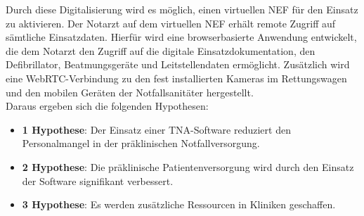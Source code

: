 Durch diese Digitalisierung wird es möglich, einen virtuellen \ac{NEF} für den Einsatz zu aktivieren. Der Notarzt auf dem virtuellen \ac{NEF} erhält remote Zugriff auf sämtliche Einsatzdaten. Hierfür wird eine browserbasierte Anwendung entwickelt, die dem Notarzt den Zugriff auf die digitale Einsatzdokumentation, den Defibrillator, Beatmungsgeräte und Leitstellendaten ermöglicht. Zusätzlich wird eine WebRTC-Verbindung zu den fest installierten Kameras im Rettungswagen und den mobilen Geräten der Notfallsanitäter hergestellt.
\\

Daraus ergeben sich die folgenden Hypothesen:

\begin{itemize}
    \item \textbf{1 Hypothese}: Der Einsatz einer TNA-Software reduziert den Personalmangel in der präklinischen Notfallversorgung.
    
    \item \textbf{2 Hypothese}: Die präklinische Patientenversorgung wird durch den Einsatz der Software signifikant verbessert.
    
    \item \textbf{3 Hypothese}: Es werden zusätzliche Ressourcen in Kliniken geschaffen.
  \end{itemize}
